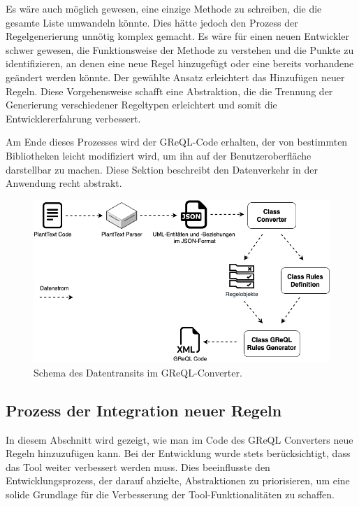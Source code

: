 Es wäre auch möglich gewesen, eine einzige Methode zu schreiben, die die gesamte Liste umwandeln könnte. Dies hätte
jedoch den Prozess der Regelgenerierung unnötig komplex gemacht. Es wäre für einen neuen Entwickler schwer gewesen, die
Funktionsweise der Methode zu verstehen und die Punkte zu identifizieren, an denen eine neue Regel hinzugefügt oder
eine bereits vorhandene geändert werden könnte. Der gewählte Ansatz erleichtert das Hinzufügen neuer Regeln. Diese
Vorgehensweise schafft eine Abstraktion, die die Trennung der Generierung verschiedener Regeltypen erleichtert und somit
die Entwicklererfahrung verbessert.

Am Ende dieses Prozesses wird der GReQL-Code erhalten, der von bestimmten Bibliotheken leicht modifiziert wird, um ihn
auf der Benutzeroberfläche darstellbar zu machen. Diese Sektion beschreibt den Datenverkehr in der Anwendung recht
abstrakt.

\begin{figure}[h!]
    \centering
    \includegraphics[width=12cm]{images/transit}
    \caption{Schema des Datentransits im GReQL-Converter.}
    \label{fig:transit}
\end{figure}

\subsection{Prozess der Integration neuer Regeln}

In diesem Abschnitt wird gezeigt, wie man im Code des GReQL Converters neue Regeln hinzuzufügen kann. Bei der Entwicklung
wurde stets berücksichtigt, dass das Tool weiter verbessert werden muss. Dies beeinflusste den Entwicklungsprozess,
der darauf abzielte, Abstraktionen zu priorisieren, um eine solide Grundlage für die Verbesserung der
Tool-Funktionalitäten zu schaffen.


